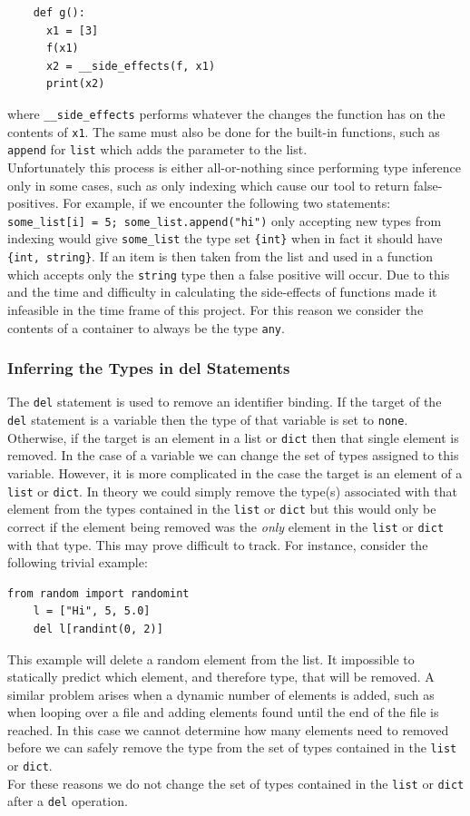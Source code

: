 \documentclass[12pt, titlepage]{article}
\begin{document}
\begin{lstlisting}
    def g():
      x1 = [3]
      f(x1)
      x2 = __side_effects(f, x1)
      print(x2)
\end{lstlisting}
where \texttt{\_\_side\_effects} performs whatever the changes the function has on the contents of \texttt{x1}. The same must also be done for the built-in functions, such as \texttt{append} for \texttt{list} which adds the parameter to the list. \\
\indent Unfortunately this process is either all-or-nothing since performing type inference only in some cases, such as only indexing which cause our tool to return false-positives. For example, if we encounter the following two statements: \texttt{some\_list[i] = 5; some\_list.append("hi")} only accepting new types from indexing would give \texttt{some\_list} the type set \texttt{\{int\}} when in fact it should have \texttt{\{int, string\}}. If an item is then taken from the list and used in a function which accepts only the \texttt{string} type then a false positive will occur. Due to this and the time and difficulty in calculating the side-effects of functions made it infeasible in the time frame of this project. For this reason we consider the contents of a container to always be the type \texttt{any}.

\subsubsection{Inferring the Types in del Statements}
The \texttt{del} statement is used to remove an identifier binding. If the target of the \texttt{del}  statement is a variable then the type of that variable is set to \texttt{none}. Otherwise, if the target is an element in a list or \texttt{dict} then that single element is removed. In the case of a variable we can change the set of types assigned to this variable. However, it is more complicated in the case the target is an element of a \texttt{list} or \texttt{dict}. In theory we could simply remove the type(s) associated with that element from the types contained in the \texttt{list} or \texttt{dict} but this would only be correct if the element being removed was the \textit{only} element in the \texttt{list} or \texttt{dict} with that type. This may prove difficult to track. For instance, consider the following trivial example:
\begin{lstlisting}[mathescape]
    from random import randomint
    l = ["Hi", 5, 5.0]
    del l[randint(0, 2)]
\end{lstlisting}
This example will delete a random element from the list. It impossible to statically predict which element, and therefore type, that will be removed. A similar problem arises when a dynamic number of elements is added, such as when looping over a file and adding elements found until the end of the file is reached. In this case we cannot determine how many elements need to removed before we can safely remove the type from the set of types contained in the \texttt{list} or \texttt{dict}. \\
\indent For these reasons we do not change the set of types contained in the \texttt{list} or \texttt{dict} after a \texttt{del} operation.
\end{document}
